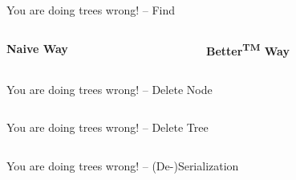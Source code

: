 \documentclass{beamer}
\begin{document}
\begin{frame}{You are doing trees wrong! -- Find}
	\begin{columns}[c]
		\begin{column}[t]{.5\linewidth}{\textbf{Naive Way}}
			
		\end{column}
		\begin{column}[t]{.5\linewidth}{\textbf{Better\textsuperscript{TM} Way}}
			
		\end{column}
	\end{columns}
\end{frame}

\begin{frame}{You are doing trees wrong! -- Delete Node}
	\begin{columns}[c]
	\end{columns}
\end{frame}

\begin{frame}{You are doing trees wrong! -- Delete Tree}
	\begin{columns}[c]
	\end{columns}
\end{frame}

\begin{frame}{You are doing trees wrong! -- (De-)Serialization}
	\begin{columns}[c]
	\end{columns}
\end{frame}
\end{document}
